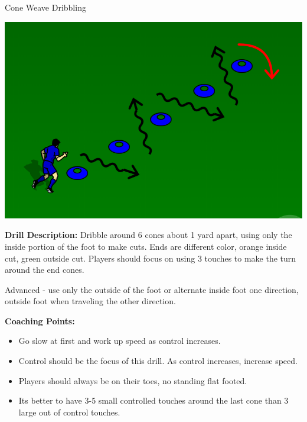 \begin{evenBlock}{Cone Weave Dribbling}


\begin{minipage}[t]{\linewidth}
    \centering
    
    \begin{minipage}{.3\linewidth} %
        \includegraphics[width=\textwidth]{../img/Trimmed/cone_dribbling}
    \end{minipage}
    \hspace{0.05\linewidth}
    \begin{minipage}{.6\linewidth} %
        \textbf{Drill Description:}
        Dribble around 6 cones about 1 yard apart, using only the inside portion of the foot to make cuts.  Ends are different color, orange inside cut, green outside cut.  Players should focus on using 3 touches to make the turn around the end cones.

        \vspace{3pt}
        
        Advanced - use only the outside of the foot or alternate inside foot one direction, outside foot when traveling the other direction.

        \vspace{10pt}
        
        \textbf{Coaching Points:}
        \begin{itemize}
        \setlength{\itemsep}{0pt}
        \setlength{\parskip}{0pt}
        \setlength{\parsep}{0pt}
        \item Go slow at first and work up speed as control increases.
        \item Control should be the focus of this drill.  As control increases, increase speed.
        \item Players should always be on their toes, no standing flat footed.
        \item Its better to have 3-5 small controlled touches around the last cone than 3 large out of control touches.
        \end{itemize}

    \end{minipage}
\end{minipage}

\end{evenBlock}